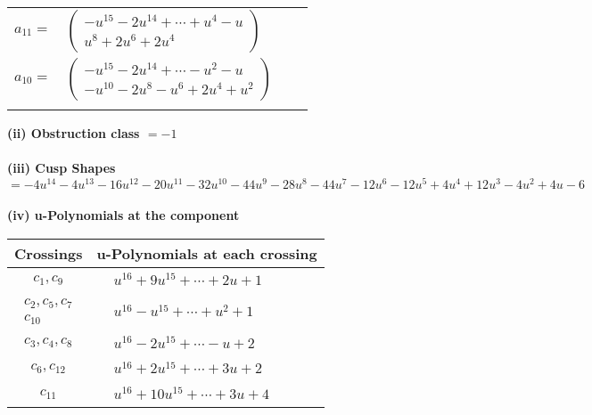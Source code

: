 \documentclass[1p]{elsarticle_modified}
\theoremstyle{definition}
\begin{document}
\begin{tabular}{m{7pt} m{180pt} m{7pt} m{180pt} }
\flushright $a_{11}=$&$\begin{pmatrix}- u^{15}-2 u^{14}+\cdots+u^4- u\\u^8+2 u^6+2 u^4\end{pmatrix}$ \\
\flushright $a_{10}=$&$\begin{pmatrix}- u^{15}-2 u^{14}+\cdots- u^2- u\\- u^{10}-2 u^8- u^6+2 u^4+u^2\end{pmatrix}$\\&\end{tabular}
\flushleft \textbf{(ii) Obstruction class $= -1$}\\~\\
\flushleft \textbf{(iii) Cusp Shapes $= -4 u^{14}-4 u^{13}-16 u^{12}-20 u^{11}-32 u^{10}-44 u^9-28 u^8-44 u^7-12 u^6-12 u^5+4 u^4+12 u^3-4 u^2+4 u-6$}\\~\\
\newpage\renewcommand{\arraystretch}{1}
\flushleft \textbf{(iv) u-Polynomials at the component}\newline \\
\begin{tabular}{m{50pt}|m{274pt}}
Crossings & \hspace{64pt}u-Polynomials at each crossing \\
\hline $$\begin{aligned}c_{1},c_{9}\end{aligned}$$&$\begin{aligned}
&u^{16}+9 u^{15}+\cdots+2 u+1
\end{aligned}$\\
\hline $$\begin{aligned}c_{2},c_{5},c_{7}\\c_{10}\end{aligned}$$&$\begin{aligned}
&u^{16}- u^{15}+\cdots+u^2+1
\end{aligned}$\\
\hline $$\begin{aligned}c_{3},c_{4},c_{8}\end{aligned}$$&$\begin{aligned}
&u^{16}-2 u^{15}+\cdots- u+2
\end{aligned}$\\
\hline $$\begin{aligned}c_{6},c_{12}\end{aligned}$$&$\begin{aligned}
&u^{16}+2 u^{15}+\cdots+3 u+2
\end{aligned}$\\
\hline $$\begin{aligned}c_{11}\end{aligned}$$&$\begin{aligned}
&u^{16}+10 u^{15}+\cdots+3 u+4
\end{aligned}$\\
\hline
\end{tabular}\\~\\
\end{document}
